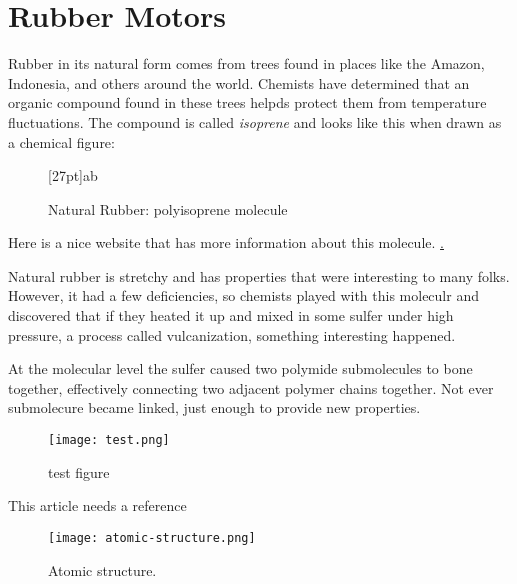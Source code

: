 \chapter{Rubber Motors}

Rubber in its natural form comes from trees found in places like the Amazon, Indonesia, and others around the world. Chemists have determined that an organic compound found in these trees helpds protect them from temperature fluctuations. The compound is called {\it isoprene} and looks like this when drawn as a chemical figure:

\begin{figure}
    \begin{center}
       \makepolymerdelims[delimiters={[]}]{5pt}[27pt]{a}{b}  
    \end{center}
    \caption{Natural Rubber: polyisoprene molecule}
\end{figure}

Here is a nice website that has more information about this molecule. \href{https://pslc.ws/macrog/isoprene.htm}.

Natural rubber is stretchy and has properties that were interesting to many folks. However, it had a few deficiencies, so chemists played with this moleculr and discovered that if they heated it up and mixed in some sulfer under high pressure, a process called vulcanization, something interesting happened.

At the molecular level the sulfer caused two polymide submolecules to bone together, effectively connecting two adjacent polymer chains together. Not ever submolecure became linked, just enough to provide new properties.

\begin{figure}[ht]
    \texttt{[image: test.png]}
    \centering
    \caption{test figure}
    
\end{figure}

This article needs a reference \cite{maheswaramma:2015}

\begin{figure}[ht]
    \texttt{[image: atomic-structure.png]}
    \centering
    \caption{Atomic structure.}
\end{figure}
